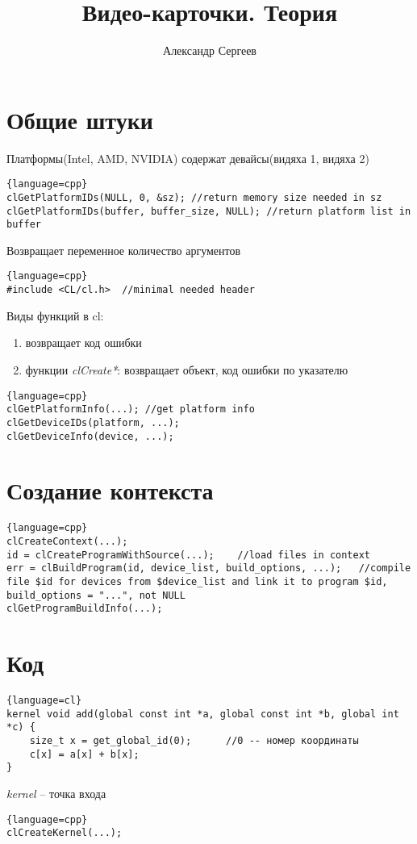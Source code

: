 \documentclass[12pt]{article}
\title{Видео-карточки. Теория}
\author{Александр Сергеев}
\date{}
\begin{document}
\maketitle
\section{Общие штуки}
Платформы(Intel, AMD, NVIDIA) содержат девайсы(видяха 1, видяха 2)
\begin{lstlisting}{language=cpp}
clGetPlatformIDs(NULL, 0, &sz); //return memory size needed in sz
clGetPlatformIDs(buffer, buffer_size, NULL); //return platform list in buffer
\end{lstlisting}
Возвращает переменное количество аргументов
\begin{lstlisting}{language=cpp}
#include <CL/cl.h>  //minimal needed header
\end{lstlisting}
Виды функций в cl:
\begin{enumerate}
    \item возвращает код ошибки
    \item функции \textit{clCreate*}: возвращает объект, код ошибки по указателю
\end{enumerate}
\begin{lstlisting}{language=cpp}
clGetPlatformInfo(...); //get platform info
clGetDeviceIDs(platform, ...);
clGetDeviceInfo(device, ...);
\end{lstlisting}
\section{Создание контекста}
\begin{lstlisting}{language=cpp}
clCreateContext(...);
id = clCreateProgramWithSource(...);    //load files in context
err = clBuildProgram(id, device_list, build_options, ...);   //compile file $id for devices from $device_list and link it to program $id, build_options = "...", not NULL
clGetProgramBuildInfo(...);
\end{lstlisting}
\section{Код}
\begin{lstlisting}{language=cl}
kernel void add(global const int *a, global const int *b, global int *c) {
    size_t x = get_global_id(0);      //0 -- номер координаты
    c[x] = a[x] + b[x];
}
\end{lstlisting}
\textit{kernel} -- точка входа
\begin{lstlisting}{language=cpp}
clCreateKernel(...);
\end{lstlisting}
\end{document}
